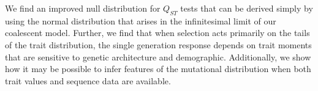 We find an improved null distribution for $Q_{ST}$ tests that can be derived
simply by using the normal distribution that arises in the infinitesimal limit
of our coalescent model. Further, we find that when selection acts primarily on
the tails of the trait distribution, the single generation response depends on
trait moments that are sensitive to genetic architecture and demographic.
Additionally, we show how it may be possible to infer features of the mutational
distribution when both trait values and sequence data are available.

